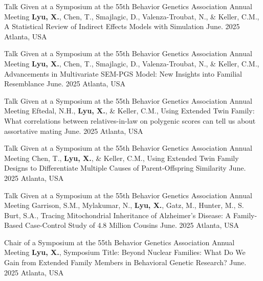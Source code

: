 \begin{cventries2}
    \cventryx
    {Talk Given at a Symposium at the 55th Behavior Genetics Association Annual Meeting} %
    {\textbf{Lyu, X.}, Chen, T., Smajlagic, D., Valenza-Troubat, N., \& Keller, C.M., A Statistical Review of Indirect Effects Models with Simulation} 
    {June. 2025} %
    {Atlanta, USA}
    
    \cventryx
    {Talk Given at a Symposium at the 55th Behavior Genetics Association Annual Meeting} %
    {\textbf{Lyu, X.}, Chen, T., Smajlagic, D., Valenza-Troubat, N., \& Keller, C.M., Advancements in Multivariate SEM-PGS Model: New Insights into Familial Resemblance} 
    {June. 2025} %
    {Atlanta, USA}

    \cventryx
    {Talk Given at a Symposium at the 55th Behavior Genetics Association Annual Meeting} %
    {Eftedal, N.H., \textbf{Lyu, X.}, \& Keller, C.M., Using Extended Twin Family: What correlations between relatives-in-law on polygenic scores can tell us about assortative mating} 
    {June. 2025} %
    {Atlanta, USA}

    \cventryx
    {Talk Given at a Symposium at the 55th Behavior Genetics Association Annual Meeting} %
    {Chen, T., \textbf{Lyu, X.}, \& Keller, C.M., Using Extended Twin Family Designs to Differentiate Multiple Causes of Parent-Offspring Similarity} 
    {June. 2025} %
    {Atlanta, USA}

    \cventryx
    {Talk Given at a Symposium at the 55th Behavior Genetics Association Annual Meeting} %
    {Garrison, S.M.,  Mylakumar, N., \textbf{Lyu, X.}, Gatz, M., Hunter, M., S. Burt, S.A., Tracing Mitochondrial Inheritance of Alzheimer's Disease: A Family-Based Case-Control Study of 4.8 Million Cousins} 
    {June. 2025} %
    {Atlanta, USA}

    \cventryx
    {Chair of a Symposium at the 55th Behavior Genetics Association Annual Meeting} %
    {\textbf{Lyu, X.}, Symposium Title: Beyond Nuclear Families: What Do We Gain from Extended Family Members in Behavioral Genetic Research?}
    {June. 2025} %
    {Atlanta, USA}


\end{cventries2}
